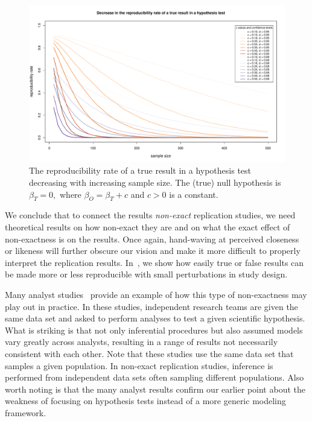 \documentclass[meta,authordate]{jote-new-article}
\newcounter{result}
\begin{document}
\begin{figure}[b]
  \begin{fullwidth}
    \centering
    \includegraphics[width=\textwidth]{Figure_1.pdf}
    \caption{The reproducibility rate of a true result in a hypothesis test decreasing with increasing sample size. The (true) null hypothesis is $\beta_{T}=0,$ where $\beta_{O}=\beta_{T}+c$ and $c>0$  is a constant.}
    \label{fig:samplesize}
  \end{fullwidth}
\end{figure}


We conclude that to connect the results {\em non-exact} replication studies, we need theoretical results on how non-exact they are and on what the exact effect of non-exactness is on the results. Once again, hand-waving at perceived closeness or likeness will further obscure our vision and make it more difficult to properly interpret the replication results. In~\textcite{Buzbas2023}, we show how easily true or false results can be made more or less reproducible with small perturbations in study design.

Many analyst studies~\parencite[e.g.,][]{breznau2022observing,hoogeveen2022many,Silberzahn2018} provide an example of how this type of non-exactness may play out in practice. In these studies, independent research teams are given the same data set and asked to perform analyses to test a given scientific hypothesis. What is striking is that not only inferential procedures but also assumed models vary greatly across analysts, resulting in a range of results not necessarily consistent with each other. Note that these studies use the same data set that samples a given population. In non-exact replication studies, inference is performed from independent data sets often sampling different populations. Also worth noting is that the many analyst results confirm our earlier point about the weakness of focusing on hypothesis tests instead of a more generic modeling framework.
\end{document}
